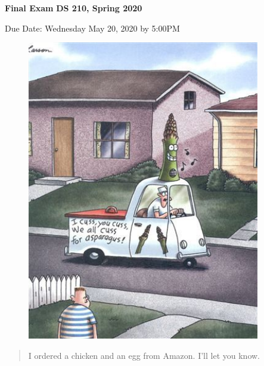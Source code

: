 \documentclass[13pt]{article}\usepackage[]{graphicx}\usepackage[]{color}
\begin{document}

\textbf{\Large Final Exam }\hfill{}\textbf{DS 210, Spring 2020}

\vspace{0.25in}


Due Date: Wednesday May 20, 2020 by 5:00PM

\vspace{0.25in}

\begin{figure}[h!]
  \centering
  \includegraphics[width=4in]{asparagus.jpg}\\
\end{figure}

\vspace{0.25in}

\begin{quote}
  \Large{I ordered a chicken and an egg from Amazon. I'll let you know.}
\end{quote}

\vspace{0.5in}
\end{document}
